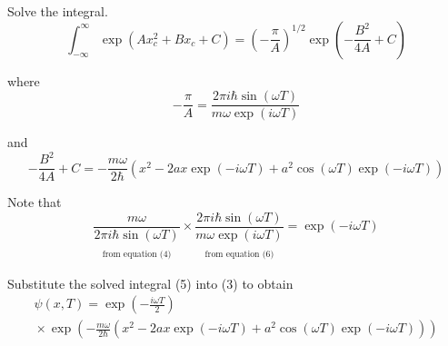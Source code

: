 \documentclass[12pt]{article}
\begin{document}
Solve the integral.
\begin{equation*}
\int_{-\infty}^\infty\exp(Ax_c^2+Bx_c+C)
=\left(-\frac{\pi}{A}\right)^{1/2}
\exp\left(-\frac{B^2}{4A}+C\right)
\tag{5}
\end{equation*}

where
\begin{equation*}
-\frac{\pi}{A}
=\frac{2\pi i\hbar\sin(\omega T)}{m\omega\exp(i\omega T)}
\tag{6}
\end{equation*}

and
\begin{equation*}
-\frac{B^2}{4A}+C
=-\frac{m\omega}{2\hbar}
\left(x^2-2ax\exp(-i\omega T)+a^2\cos(\omega T)\exp(-i\omega T)\right)
\tag{7}
\end{equation*}

Note that
\begin{equation*}
\underset{\substack{\\[1ex]\text{from equation (4)}}}
{\frac{m\omega}{2\pi i\hbar\sin(\omega T)}}
\times
\underset{\substack{\\[1ex]\text{from equation (6)}}}
{\frac{2\pi i\hbar\sin(\omega T)}{m\omega\exp(i\omega T)}}
=\exp(-i\omega T)
\tag{8}
\end{equation*}

Substitute the solved integral (5) into (3) to obtain
\begin{multline*}
\psi(x,T)=\exp\left(-\frac{i\omega T}{2}\right)
\\
{}\times
\exp\left(
-\frac{m\omega}{2\hbar}
\left(x^2-2ax\exp(-i\omega T)+a^2\cos(\omega T)\exp(-i\omega T)\right)
\right)
\end{multline*}
\end{document}
